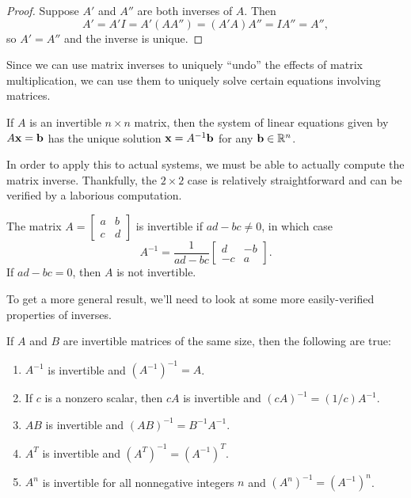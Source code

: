 \documentclass[../m073main.tex]{subfiles}
\begin{document}
\begin{proof}
	Suppose $A'$ and $A''$ are both inverses of $A$.
	Then
	\[ A' = A'I = A'(AA'') = (A'A)A'' = IA'' = A'', \]
	so $A' = A''$ and the inverse is unique.
\end{proof}

Since we can use matrix inverses to uniquely ``undo'' the effects of matrix multiplication, we can use them to uniquely solve certain equations involving matrices.

\begin{theorem}
	If $A$ is an invertible $n\times n$ matrix, then the system of linear equations given by $A\mathbf{x} = \mathbf{b}$ has the unique solution $\mathbf{x} = A^{-1}\mathbf{b}$ for any $\mathbf{b}\in\mathbb{R}^n$.
\end{theorem}

In order to apply this to actual systems, we must be able to actually compute the matrix inverse.
Thankfully, the $2 \times 2$ case is relatively straightforward and can be verified by a laborious computation.


\begin{theorem}
	The matrix $A = \begin{bmatrix} a & b \\ c & d \end{bmatrix}$ is invertible if $ad - bc \neq 0$, in which case
	\[ A^{-1} = \frac{1}{ad-bc} \begin{bmatrix} d & -b \\ -c & a \end{bmatrix}. \]
	If $ad-bc = 0$, then $A$ is not invertible.
\end{theorem}

To get a more general result, we'll need to look at some more easily-verified properties of inverses.

\begin{theorem}
	If $A$ and $B$ are invertible matrices of the same size, then the following are true:
	\begin{enumerate}[label=(\alph*)]
		\item $A^{-1}$ is invertible and $(A^{-1})^{-1} = A$.
		\item If $c$ is a nonzero scalar, then $cA$ is invertible and $(cA)^{-1} = (1 / c) A^{-1}$.
		\item $AB$ is invertible and $(AB)^{-1} = B^{-1}A^{-1}$.
		\item $A^T$ is invertible and $(A^T)^{-1} = (A^{-1})^T$.
		\item $A^n$ is invertible for all nonnegative integers $n$ and $(A^n)^{-1} = (A^{-1})^n$.
	\end{enumerate}
\end{theorem}
\end{document}
